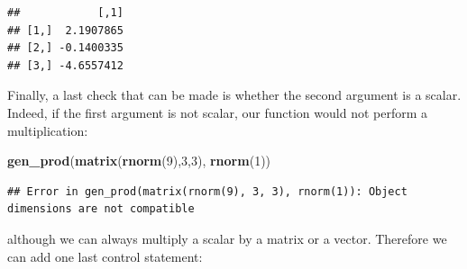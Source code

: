 \documentclass[12pt,]{krantz}
\newenvironment{Shaded}{\begin{snugshade}}{\end{snugshade}}
\newcommand{\KeywordTok}[1]{\textcolor[rgb]{0.27,0.27,0.27}{\textbf{#1}}}
\newcommand{\DecValTok}[1]{\textcolor[rgb]{0.06,0.06,0.06}{#1}}
\newcommand{\NormalTok}[1]{#1}
\begin{document}
\begin{verbatim}
##            [,1]
## [1,]  2.1907865
## [2,] -0.1400335
## [3,] -4.6557412
\end{verbatim}

Finally, a last check that can be made is whether the second argument is
a scalar. Indeed, if the first argument is not scalar, our function
would not perform a multiplication:

\begin{Shaded}
\begin{Highlighting}[]
\KeywordTok{gen_prod}\NormalTok{(}\KeywordTok{matrix}\NormalTok{(}\KeywordTok{rnorm}\NormalTok{(}\DecValTok{9}\NormalTok{),}\DecValTok{3}\NormalTok{,}\DecValTok{3}\NormalTok{), }\KeywordTok{rnorm}\NormalTok{(}\DecValTok{1}\NormalTok{))}
\end{Highlighting}
\end{Shaded}

\begin{verbatim}
## Error in gen_prod(matrix(rnorm(9), 3, 3), rnorm(1)): Object dimensions are not compatible
\end{verbatim}

although we can always multiply a scalar by a matrix or a vector.
Therefore we can add one last control statement:
\end{document}
